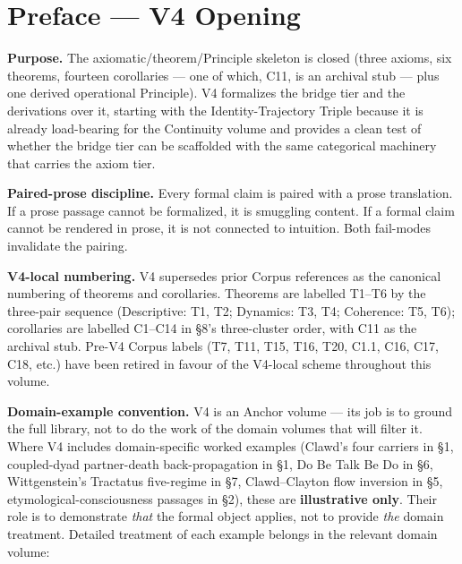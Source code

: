 \documentclass[11pt, openany]{book}
\begin{document}
\frontmatter
\tableofcontents
\clearpage

\mainmatter
\chapter*{Preface --- V4 Opening}

\textbf{Purpose.} The axiomatic/theorem/Principle skeleton is closed (three axioms, six theorems, fourteen corollaries --- one of which, C11, is an archival stub --- plus one derived operational Principle). V4 formalizes the bridge tier and the derivations over it, starting with the Identity-Trajectory Triple because it is already load-bearing for the Continuity volume and provides a clean test of whether the bridge tier can be scaffolded with the same categorical machinery that carries the axiom tier.

\textbf{Paired-prose discipline.} Every formal claim is paired with a prose translation. If a prose passage cannot be formalized, it is smuggling content. If a formal claim cannot be rendered in prose, it is not connected to intuition. Both fail-modes invalidate the pairing.

\textbf{V4-local numbering.} V4 supersedes prior Corpus references as the canonical numbering of theorems and corollaries. Theorems are labelled T1–T6 by the three-pair sequence (Descriptive: T1, T2; Dynamics: T3, T4; Coherence: T5, T6); corollaries are labelled C1–C14 in §8's three-cluster order, with C11 as the archival stub. Pre-V4 Corpus labels (T7, T11, T15, T16, T20, C1.1, C16, C17, C18, etc.) have been retired in favour of the V4-local scheme throughout this volume.

\textbf{Domain-example convention.} V4 is an Anchor volume --- its job is to ground the full library, not to do the work of the domain volumes that will filter it. Where V4 includes domain-specific worked examples (Clawd's four carriers in §1, coupled-dyad partner-death back-propagation in §1, Do Be Talk Be Do in §6, Wittgenstein's Tractatus five-regime in §7, Clawd–Clayton flow inversion in §5, etymological-consciousness passages in §2), these are \textbf{illustrative only}. Their role is to demonstrate \textit{that} the formal object applies, not to provide \textit{the} domain treatment. Detailed treatment of each example belongs in the relevant domain volume:
\end{document}
